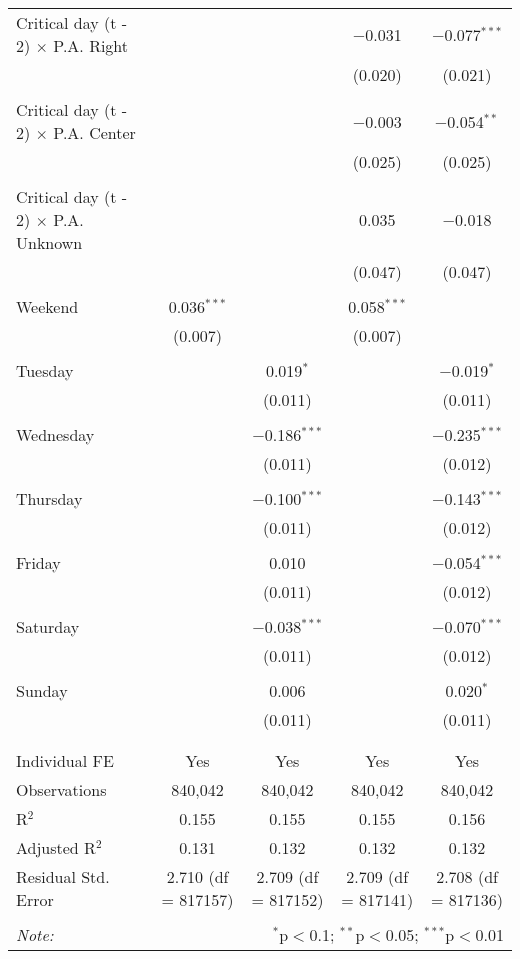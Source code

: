 \documentclass[
]{article}
\begin{document}
\begin{table}[!htbp]
{\begin{tabular}{@{\extracolsep{5pt}}lcccc}
 Critical day (t - 2) $\times$ P.A. Right &  &  & $-$0.031 & $-$0.077$^{***}$ \\ 
  &  &  & (0.020) & (0.021) \\ 
  & & & & \\ 
 Critical day (t - 2) $\times$ P.A. Center &  &  & $-$0.003 & $-$0.054$^{**}$ \\ 
  &  &  & (0.025) & (0.025) \\ 
  & & & & \\ 
 Critical day (t - 2) $\times$ P.A. Unknown &  &  & 0.035 & $-$0.018 \\ 
  &  &  & (0.047) & (0.047) \\ 
  & & & & \\ 
 Weekend & 0.036$^{***}$ &  & 0.058$^{***}$ &  \\ 
  & (0.007) &  & (0.007) &  \\ 
  & & & & \\ 
 Tuesday &  & 0.019$^{*}$ &  & $-$0.019$^{*}$ \\ 
  &  & (0.011) &  & (0.011) \\ 
  & & & & \\ 
 Wednesday &  & $-$0.186$^{***}$ &  & $-$0.235$^{***}$ \\ 
  &  & (0.011) &  & (0.012) \\ 
  & & & & \\ 
 Thursday &  & $-$0.100$^{***}$ &  & $-$0.143$^{***}$ \\ 
  &  & (0.011) &  & (0.012) \\ 
  & & & & \\ 
 Friday &  & 0.010 &  & $-$0.054$^{***}$ \\ 
  &  & (0.011) &  & (0.012) \\ 
  & & & & \\ 
 Saturday &  & $-$0.038$^{***}$ &  & $-$0.070$^{***}$ \\ 
  &  & (0.011) &  & (0.012) \\ 
  & & & & \\ 
 Sunday &  & 0.006 &  & 0.020$^{*}$ \\ 
  &  & (0.011) &  & (0.011) \\ 
  & & & & \\ 
\hline \\[-1.8ex] 
Individual FE & Yes & Yes & Yes & Yes \\ 
Observations & 840,042 & 840,042 & 840,042 & 840,042 \\ 
R$^{2}$ & 0.155 & 0.155 & 0.155 & 0.156 \\ 
Adjusted R$^{2}$ & 0.131 & 0.132 & 0.132 & 0.132 \\ 
Residual Std. Error & 2.710 (df = 817157) & 2.709 (df = 817152) & 2.709 (df = 817141) & 2.708 (df = 817136) \\ 
\hline 
\hline \\[-1.8ex] 
\textit{Note:}  & \multicolumn{4}{r}{$^{*}$p$<$0.1; $^{**}$p$<$0.05; $^{***}$p$<$0.01} \\ 
\end{tabular}
} 
\end{table}
\end{document}
